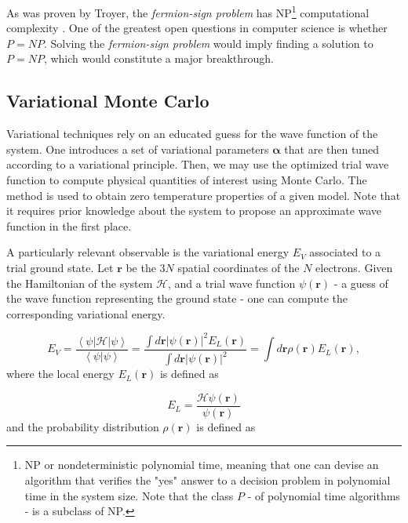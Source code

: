 As was proven by Troyer, the \emph{fermion-sign problem} has NP\footnote{NP or nondeterministic polynomial time, meaning that one can devise an algorithm that verifies the "yes" answer to a decision problem in polynomial time in the system size.
Note that the class $P$ - of polynomial time algorithms - is a subclass of NP.} computational complexity \cite{troyer_computational_2005}.
One of the greatest open questions in computer science is whether $P = NP$.
Solving the \emph{fermion-sign problem} would imply finding a solution to $P = NP$, which would constitute a major breakthrough.



\subsection{Variational Monte Carlo}

Variational techniques rely on an educated guess for the wave function of the system.
One introduces a set of variational parameters $\bm \alpha$ that are then tuned according to a variational principle.
Then, we may use the optimized trial wave function to compute physical quantities of interest using Monte Carlo.
The method is used to obtain zero temperature properties of a given model.
Note that it requires prior knowledge about the system to propose an approximate wave function in the first place.

A particularly relevant observable is the variational energy $E_V$ associated to a trial ground state.
Let $\bm r$ be the $3N$ spatial coordinates of the $N$ electrons.
Given the Hamiltonian of the system $\mathcal{H}$, and a trial wave function $\psi (\bm r)$ - a guess of the wave function representing the ground state - one can compute the corresponding variational energy.

\begin{equation}\label{eq:variational_energy}
E_V = \frac{\left\langle \psi | \mathcal{H} | \psi \right \rangle}{\left\langle \psi | \psi \right \rangle} = \frac{ \int d\bm r |\psi (\bm r)|^2 E_L (\bm r)}{\int d\bm r | \psi (\bm r)|^2 } = \int d\bm r\rho (\bm r) E_L (\bm r) ,
\end{equation}
where the local energy $E_L (\bm r)$ is defined as

\begin{equation}\label{eq:local_energy}
E_L = \frac{\mathcal{H} \psi (\bm r) }{\psi (\bm r)}
\end{equation}
and the probability distribution $\rho (\bm r)$ is defined as

